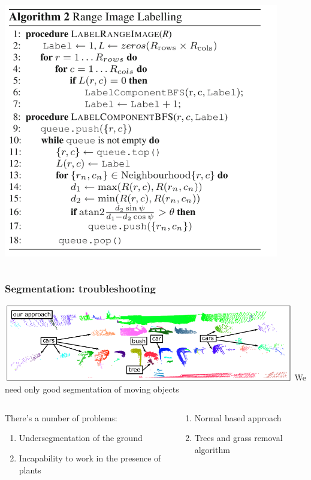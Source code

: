 \documentclass[xcolor=table,usenames,dvipsnames]{beamer}
\begin{document}
\begin{frame}
\begin{columns}
\begin{column}{0.5\textwidth}
\includegraphics[width=0.9\textwidth]{img/segmentation_algo.png}
\end{column}
\end{columns}
\end{frame}
\begin{frame}
\frametitle{Segmentation: troubleshooting}
\includegraphics[width=0.95\textwidth]{img/segmentation_sample.png}
We need only good segmentation of moving objects
\begin{columns}
\begin{column}{0.5\textwidth}
There's a number of problems:
\begin{enumerate}
\item Undersegmentation of the ground
\item Incapability to work in the presence of plants
\end{enumerate}
\end{column}
\begin{column}{0.5\textwidth}
\begin{enumerate}
\item Normal based approach
\item Trees and grass removal algorithm
\end{enumerate}
\end{column}
\end{columns}
\end{frame}
\end{document}
